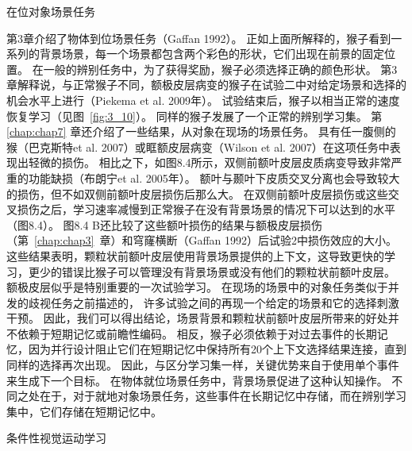 在位对象场景任务

第3章介绍了物体到位场景任务（Gaffan 1992）。
正如上面所解释的，猴子看到一系列的背景场景，每一个场景都包含两个彩色的形状，它们出现在前景的固定位置。
在一般的辨别任务中，为了获得奖励，猴子必须选择正确的颜色形状。
第3章解释说，与正常猴子不同，额极皮层病变的猴子在试验二中对给定场景和选择的机会水平上进行（Piekema et al. 2009年）。
试验结束后，猴子以相当正常的速度恢复学习（见图~\ref{fig:3_10}）。
同样的猴子发展了一个正常的辨别学习集。
第 \ref{chap:chap7} 章还介绍了一些结果，从对象在现场的场景任务。
具有任一腹侧的猴（巴克斯特et al. 2007）或眶额皮层病变（Wilson et al. 2007）在这项任务中表现出轻微的损伤。
相比之下，如图8.4所示，双侧前额叶皮层皮质病变导致非常严重的功能缺损（布朗宁et al. 2005年）。
额叶与颞叶下皮质交叉分离也会导致较大的损伤，但不如双侧前额叶皮层损伤后那么大。
在双侧前额叶皮层损伤或这些交叉损伤之后，学习速率减慢到正常猴子在没有背景场景的情况下可以达到的水平（图8.4）。
图8.4 B还比较了这些额叶损伤的结果与额极皮层损伤（第~\ref{chap:chap3}~章）和穹窿横断（Gaffan 1992）后试验2中损伤效应的大小。
这些结果表明，颗粒状前额叶皮层使用背景场景提供的上下文，这导致更快的学习，更少的错误比猴子可以管理没有背景场景或没有他们的颗粒状前额叶皮层。
额极皮层似乎是特别重要的一次试验学习。
在现场的场景中的对象任务类似于并发的歧视任务之前描述的，
许多试验之间的再现一个给定的场景和它的选择刺激干预。
因此，我们可以得出结论，场景背景和颗粒状前额叶皮层所带来的好处并不依赖于短期记忆或前瞻性编码。
相反，猴子必须依赖于对过去事件的长期记忆，因为并行设计阻止它们在短期记忆中保持所有20个上下文选择结果连接，直到同样的选择再次出现。
因此，与区分学习集一样，关键优势来自于使用单个事件来生成下一个目标。
在物体就位场景任务中，背景场景促进了这种认知操作。
不同之处在于，对于就地对象场景任务，这些事件在长期记忆中存储，而在辨别学习集中，它们存储在短期记忆中。



条件性视觉运动学习

